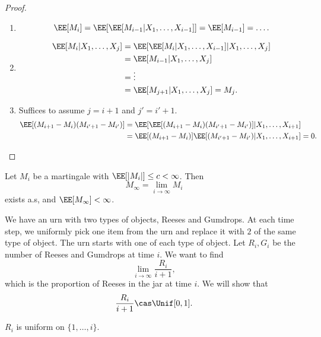 \begin{proof}
\begin{enumerate}
	\item 
		\[\EE[M_i] = \EE[\EE[M_{i-1} | X_1, \hdots, X_{i-1}]] = \EE[M_{i-1}] = \hdots. \]
	\item 
		\begin{align*}
			\EE[M_i|X_1, \hdots, X_j] &= \EE[\EE[M_i|X_1, \hdots, X_{i-1}]|X_1, \hdots, X_j] \\
																&= \EE[M_{i-1}|X_1, \hdots, X_j] \\
																&= \vdots \\
																&= \EE[M_{j+1} | X_1, \hdots, X_j] = M_j. 
		\end{align*}	
	\item Suffices to assume $j=i+1$ and $j' = i'+1$. 
		\begin{align*}
			\EE[(M_{i+1}-M_i)(M_{i'+1}-M_{i'})] &= \EE[\EE[(M_{i+1}-M_i)(M_{i'+1}-M_{i'})]|X_1, \hdots, X_{i+1}] \\
																					&= \EE[(M_{i+1}-M_i)]\EE[(M_{i'+1}-M_{i'}) | X_1, \hdots, X_{i+1}] = 0. 
		\end{align*}
\end{enumerate}
\end{proof}


\begin{theorem}

Let $M_i$ be a martingale with $\EE[\vert M_i\vert] \leq c < \infty$. Then 
\[M_{\infty} = \lim_{i\rightarrow \infty}M_i\]
exists a.s, and $\EE[M_{\infty}] < \infty$.  
\end{theorem}

\begin{example}
\end{example}

We have an urn with two types of objects, Reeses and Gumdrops. At each time step, we uniformly pick one item from the urn and replace it with $2$ of the same type of object. The urn starts with one of each type of object. Let $R_i,G_i$ be the number of Reeses and Gumdrops at time $i$. We want to find 
\[\lim_{i\rightarrow \infty}\frac{R_{i}}{i+1},\] 
which is the proportion of Reeses in the jar at time $i$. We will show that 
\[\frac{R_i}{i+1}\cas \Unif[0,1].\] 

\begin{theorem}
\claimlabel

$R_i$ is uniform on $\{1,\hdots, i\}$. 
\end{theorem}

